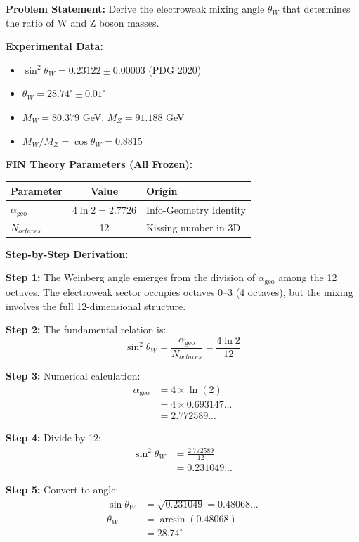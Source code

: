 \documentclass[11pt,a4paper]{book}
\theoremstyle{remark}
\newcommand{\alphageo}{\alpha_{\text{geo}}}
\begin{document}
\textbf{Problem Statement:} Derive the electroweak mixing angle $\theta_W$ that determines the ratio of W and Z boson masses.

\textbf{Experimental Data:}
\begin{itemize}
    \item $\sin^2\theta_W = 0.23122 \pm 0.00003$ (PDG 2020)
    \item $\theta_W = 28.74^\circ \pm 0.01^\circ$
    \item $M_W = 80.379$ GeV, $M_Z = 91.188$ GeV
    \item $M_W/M_Z = \cos\theta_W = 0.8815$
\end{itemize}

\textbf{FIN Theory Parameters (All Frozen):}
\begin{table}[H]
\centering
\begin{tabular}{|l|c|l|}
\hline
\textbf{Parameter} & \textbf{Value} & \textbf{Origin} \\
\hline
$\alphageo$ & $4\ln 2 = 2.7726$ & Info-Geometry Identity \\
$N_{octaves}$ & 12 & Kissing number in 3D \\
\hline
\end{tabular}
\end{table}

\textbf{Step-by-Step Derivation:}

\textbf{Step 1:} The Weinberg angle emerges from the division of $\alphageo$ among the 12 octaves. The electroweak sector occupies octaves 0--3 (4 octaves), but the mixing involves the full 12-dimensional structure.

\textbf{Step 2:} The fundamental relation is:
\begin{equation}
\sin^2\theta_W = \frac{\alphageo}{N_{octaves}} = \frac{4\ln 2}{12}
\end{equation}

\textbf{Step 3:} Numerical calculation:
\begin{align}
\alphageo &= 4 \times \ln(2) \\
&= 4 \times 0.693147... \\
&= 2.772589...
\end{align}

\textbf{Step 4:} Divide by 12:
\begin{align}
\sin^2\theta_W &= \frac{2.772589}{12} \\
&= 0.231049...
\end{align}

\textbf{Step 5:} Convert to angle:
\begin{align}
\sin\theta_W &= \sqrt{0.231049} = 0.48068... \\
\theta_W &= \arcsin(0.48068) \\
&= 28.74^\circ
\end{align}
\end{document}
